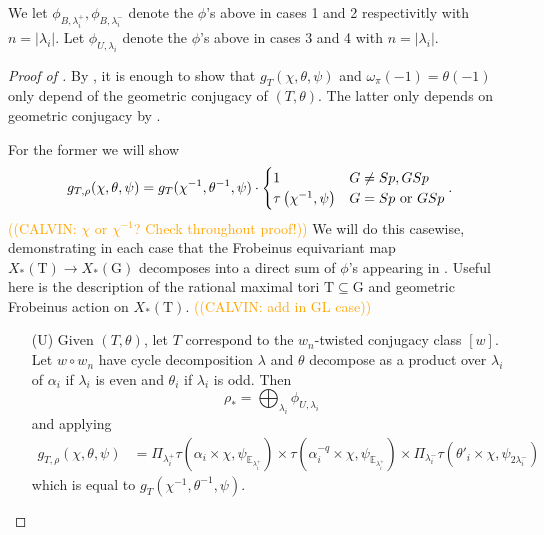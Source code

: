 \documentclass[12pt, reqno]{amsart}
\theoremstyle{definition}
\theoremstyle{definition}
\theoremstyle{definition}
\newcommand{\fieldCharacter}{\psi}
\newcommand{\quadraticExtension}{\mathbb{E}}
\newcommand{\quadraticFieldExtension}[1]{\quadraticExtension_{#1}}
\newcommand{\GaussSumCharacter}[3]{\tau\left(#1 \times #2, #3\right)}
\newcommand{\algebraicGroup}[1]{\boldsymbol{\mathrm{#1}}}
\newcommand{\calvin}[1]{\textcolor{orange}{\sffamily ((CALVIN: #1))}}
\begin{document}
We let $\phi_{B,\lambda_i^+}, \phi_{B,\lambda_i^-}$ denote the $\phi$'s above in cases 1 and 2 respectivitly with $n = |\lambda_i|$. 
Let $\phi_{U,\lambda_i}$ denote the $\phi$'s above in cases 3 and 4 with $n = |\lambda_i|$.


\begin{proof}[Proof of ] 
By , it is enough to show that $g_{T}(\chi,\theta,\psi)$ and $\omega_{\pi}(-1) = \theta(-1)$ only depend of the geometric conjugacy of $(T,\theta)$. The latter only depends on geometric conjugacy by .

For the former we will show
\[
g_{T,\rho}(\chi,\theta,\fieldCharacter)= g_{T}(\chi^{-1},\theta^{-1},\fieldCharacter) \cdot \begin{cases}
        1  & G \neq Sp, GSp\\
        \tau\left(\chi^{-1}, \fieldCharacter\right) & G = Sp \textnormal{ or } GSp
    \end{cases}.
\]
\calvin{$\chi$ or $\chi^{-1}$? Check throughout proof!}
We will do this casewise, demonstrating in each case that the Frobeinus equivariant map $X_*(\algebraicGroup{T}) \to X_*(\algebraicGroup{G})$ decomposes into a direct sum of $\phi$'s appearing in . Useful here is the description of the rational maximal tori $\algebraicGroup{T} \subseteq \algebraicGroup{G}$ and geometric Frobeinus action on $X_*(\algebraicGroup{T})$. 
\calvin{add in GL case}
\begin{enumerate}
    \item[($\algebraicGroup{U}$)] Given $(T,\theta)$, let $T$ correspond to the $w_n$-twisted conjugacy class $[w]$. Let $w \circ w_n$ have cycle decomposition $\lambda$ 
	and $\theta$ decompose as a product over $\lambda_i$ of $\alpha_i$ if $\lambda_i$ is even and $\theta_i$ if $\lambda_i$ is odd. Then
	$$\rho_* = \bigoplus_{\lambda_i} \phi_{U,\lambda_i}$$
	and applying 
    \begin{align*}
		g_{T,\rho}(\chi,\theta,\psi) &= \Pi_{\lambda_i^+} \GaussSumCharacter{\alpha_i}{\chi}{\fieldCharacter_{\quadraticFieldExtension{\lambda_i^+}}} \times \GaussSumCharacter{\alpha_i^{-q}}{\chi}{\fieldCharacter_{\quadraticFieldExtension{\lambda_i^+}}} \times \Pi_{\lambda_i^-} \GaussSumCharacter{\theta'_i}{\chi}{\fieldCharacter_{2\lambda_i^-}} 
	\end{align*}
	which is equal to $g_{T}(\chi^{-1},\theta^{-1},\psi)$.
	\begin{comment}old hacky version

\end{comment}
\end{enumerate}
\end{proof}
\end{document}
